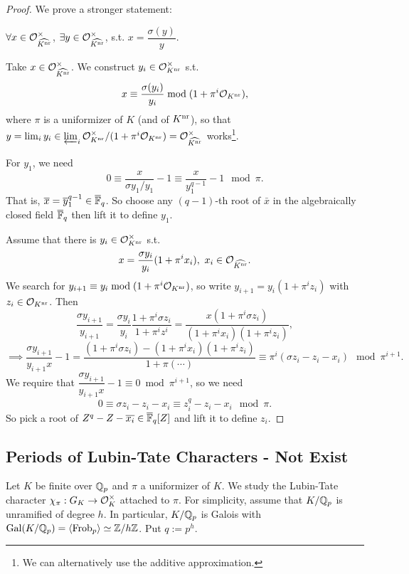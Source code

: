 \begin{proof}
    We prove a stronger statement: \begin{center}
        $\forall x\in\mathcal{O}_{\widehat{K^{\mathrm{nr}}}}^\times$, $\exists y\in \mathcal{O}_{\widehat{K^{\mathrm{nr}}}}^\times$, s.t. $x = \dfrac{\sigma(y)}{y}$.
    \end{center}\par
    Take $x\in\mathcal{O}_{\widehat{K^{\mathrm{nr}}}}^\times$.
    We construct $y_i\in\mathcal{O}_{K^{\mathrm{nr}}}^\times$ s.t. \[x \equiv {\sigma(y_i)\over y_i}\bmod (1 + \pi^{i}\mathcal{O}_{K^{\mathrm{nr}}}),\] where $\pi$ is a uniformizer of $K$ (and of $K^{\mathrm{nr}}$),
    so that $y = \lim_i y_i\in
    \varprojlim_{i}\mathcal{O}_{K^{\mathrm{nr}}}^\times/(1 + \pi^i\mathcal{O}_{K^{\mathrm{nr}}})
    = \mathcal{O}_{\widehat{K^{\mathrm{nr}}}}^\times $ works\footnote{
        We can alternatively use the additive approximation.
    }.\par
    For $y_1$,
    we need \[0\equiv \frac{x}{\sigma y_1 / y_1}-1
    \equiv \frac{x}{y_1^{q-1}} - 1\mod \pi.\]
    That is, $\overline{x} = \overline{y}_1^{q-1}\in\overline{\mathbb{F}}_q$. So choose any $(q-1)$-th root of $\bar{x}$ in the algebraically closed field $\overline{\mathbb{F}}_q$ then lift it to define $y_1$.\par
    Assume that there is $y_i\in\mathcal{O}_{K^{\mathrm{nr}}}^\times$ s.t. \[x = \frac{\sigma y_i}{y_i }(1 + \pi^i x_i),\ x_i\in \O_{\widehat{K^\nr}}.\]
    We search for $y_{i+1} \equiv y_i\bmod(1 + \pi^i\mathcal{O}_{K^{\mathrm{nr}}})$,
    so write $y_{i+1} = y_i(1 + \pi^iz_i)$ with $z_i\in\mathcal{O}_{K^{\mathrm{nr}}}$.
    Then \[\frac{\sigma y_{i+1}}{y_{i+1}}
    = \frac{\sigma y_i}{y_i}\frac{1 + \pi^i\sigma z_i }{1 + \pi^iz^i}
    = \frac{x(1 + \pi^i\sigma z_i)}{(1 + \pi^ix_i)(1 + \pi^iz_i)},\]
    \[\implies \frac{\sigma y_{i+1}}{y_{i+1}x} - 1 = \frac{(1 + \pi^i\sigma z_i) - (1 + \pi^ix_i)(1 + \pi^iz_i)}{1 + \pi(\cdots)}
    \equiv \pi^i(\sigma z_i - z_i - x_i)
    \mod \pi^{i+1}.\]
    We require that $\dfrac{\sigma y_{i+1}}{y_{i+1}x} - 1\equiv 0\bmod \pi^{i+1}$,
    so we need\[0\equiv \sigma z_i - z_i - x_i \equiv z_i^q - z_i - x_i\mod \pi.\]
    So pick a root of $Z^q - Z - \overline{x_i}\in\overline{\mathbb{F}}_q[Z]$ and lift it to define $z_i$.
\end{proof}

\subsection{Periods of Lubin-Tate Characters - Not Exist}
Let $K$ be finite over $\mathbb{Q}_p$ and $\pi$ a uniformizer of $K$.
We study the Lubin-Tate character $\chi_\pi : G_K\to\mathcal{O}_K^\times$ attached to $\pi$.
For simplicity, assume that $K/\mathbb{Q}_p$ is unramified of degree $h$. In particular, $K/\mathbb{Q}_p$ is Galois with $\operatorname{Gal}(K/\mathbb{Q}_p) = \left\langle \operatorname{Frob}_p \right\rangle \simeq\mathbb{Z}/h\mathbb{Z}$.
Put $q := p^h$.
